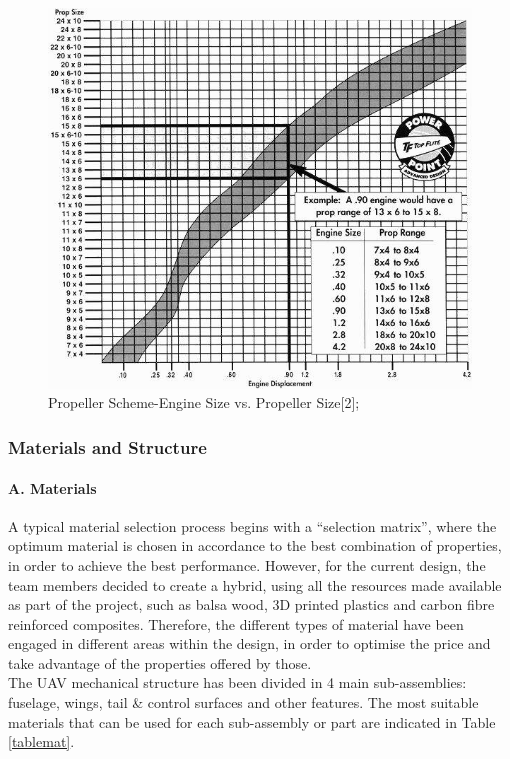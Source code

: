 \documentclass[12pt]{article}
\begin{document}
\begin{figure}[h!]
  \centering
  \includegraphics[width=13cm, scale=1]{propscheme.jpg}
  \caption{Propeller Scheme-Engine Size vs. Propeller Size[2];}
  \label{fig:prop}
\end{figure}

\newpage

\subsubsection{Materials and Structure}

\paragraph{A. Materials}
A typical material selection process begins with a “selection matrix”, where the optimum material is chosen in accordance to the best combination of properties, in order to achieve the best performance. However, for the current design, the team members decided to create a hybrid, using all the resources made available as part of the project, such as balsa wood, 3D printed plastics and carbon fibre reinforced composites. Therefore, the different types of material have been engaged in different areas within the design, in order to optimise the price and take advantage of the properties offered by those. \\

\noindent The UAV mechanical structure has been divided in 4 main sub-assemblies: fuselage, wings, tail \& control surfaces and other features. The most suitable materials that can be used for each sub-assembly or part are indicated in Table \ref{tablemat}. \\
\end{document}
